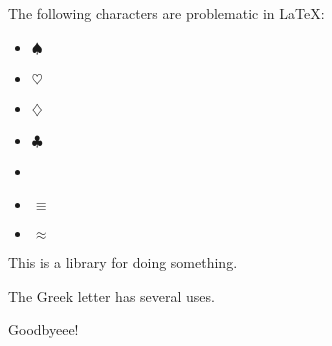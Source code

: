\documentclass[letterpaper,10pt,english]{sphinxmanual}
\begin{document}
\vspace{-5px}


\cleardoublepage

The \hspace{0pt}following \hspace{0pt}characters \hspace{0pt}are \hspace{0pt}problematic \hspace{0pt}in \hspace{0pt}LaTeX:
\begin{itemize}
\item {}
 $\spadesuit$

\item {}
 $\heartsuit$

\item {}
 $\diamondsuit$

\item {}
 $\clubsuit$

\item {}
\textmu{}

\item {}
 $\equiv$

\item {}
 $\approx$

\end{itemize}

This is a \textmu{}\sphinxhyphen{}library for doing something.

The Greek letter \textmu{} has several uses.


\vspace{10px}


\clearpage


\vspace{30mm}


Goodbyeee!
\end{document}
